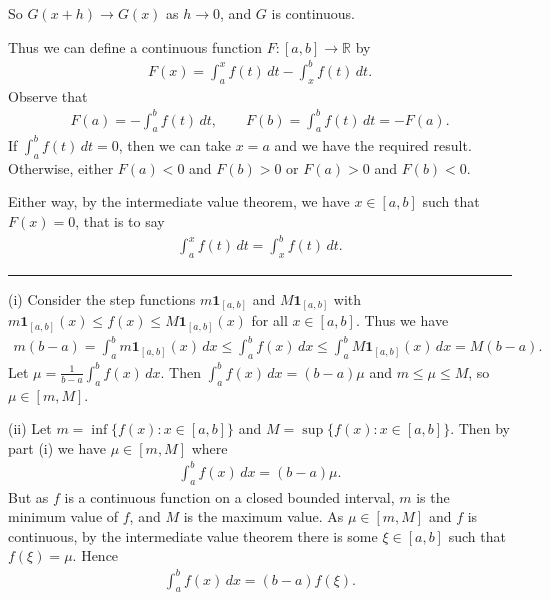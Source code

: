 \documentclass[letterpaper,10pt,english]{jupyterBook}
\begin{document}
\sphinxAtStartPar
So \(G(x+h)\rightarrow G(x)\) as \(h\rightarrow 0\), and \(G\) is continuous.

\sphinxAtStartPar
Thus we can define a continuous function \(F\colon [a,b]\rightarrow \mathbb{R}\) by
\begin{equation*}
\begin{split}
F(x) = \int_a^x f(t)\, dt - \int_x^b f(t)\, dt.
\end{split}
\end{equation*}
\sphinxAtStartPar
Observe that
\begin{equation*}
\begin{split}
F(a) = -\int_a^b f(t)\, dt,  \qquad F(b) = \int_a^b f(t)\, dt=-F(a).
\end{split}
\end{equation*}
\sphinxAtStartPar
If \(\int_a^b f(t)\, dt =0\), then we can take \(x=a\) and we have the required result. Otherwise, either \(F(a)<0\) and \(F(b)>0\) or \(F(a)>0\) and \(F(b)<0\).

\sphinxAtStartPar
Either way, by the intermediate value theorem, we have \(x\in [a,b]\) such that \(F(x)=0\), that is to say
\begin{equation*}
\begin{split}
\int_a^x f(t)\, dt = \int_x^b f(t)\, dt.
\end{split}
\end{equation*}

\bigskip\hrule\bigskip


\sphinxAtStartPar
{\hyperref[\detokenize{Problems:id75}]{}}
(i) Consider the step functions \(m\mathbf{1}_{[a,b]}\) and \(M\mathbf{1}_{[a,b]}\) with \(m\mathbf{1}_{[a,b]}(x)\leq f(x)\leq M\mathbf{1}_{[a,b]}(x)\) for all \(x\in[a,b]\). Thus we have
\begin{equation*}
\begin{split}
m(b-a)=\int_a^b m\mathbf{1}_{[a,b]}(x)\, dx \leq \int_a^b f(x)\, dx \leq \int_a^b M\mathbf{1}_{[a,b]}(x)\, dx= M(b-a).
\end{split}
\end{equation*}
\sphinxAtStartPar
Let \(\mu = \frac{1}{b-a} \int_a^b f(x)\, dx\). Then \(\int_a^b f(x)\, dx=(b-a)\mu\) and \(m\leq \mu\leq M\), so \(\mu \in [m,M]\).

\sphinxAtStartPar
(ii) Let \(m = \inf \{ f(x) : x\in [a,b] \}\) and \(M = \sup \{ f(x) : x\in [a,b] \}\). Then by part (i) we have \(\mu \in [m,M]\) where
\begin{equation*}
\begin{split}
\int_a^b f(x)\, dx =(b-a)\mu.
\end{split}
\end{equation*}
\sphinxAtStartPar
But as \(f\) is a continuous function on a closed bounded interval, \(m\) is the minimum value of \(f\), and \(M\) is the maximum value. As \(\mu\in [m,M]\) and \(f\) is continuous, by the intermediate value theorem there is some \(\xi \in [a,b]\) such that \(f(\xi ) = \mu\). Hence
\begin{equation*}
\begin{split}
\int_a^b f(x)\, dx =(b-a)f(\xi ).
\end{split}
\end{equation*}
\end{document}
